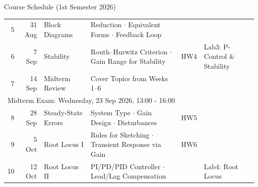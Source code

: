 \documentclass[12pt, aspectratio=169]{beamer}
\begin{document}
\begin{frame}{Course Schedule (1st Semester 2026)}
\begin{tabular}{r|r|l|l|c|l}
    5 & 31 Aug & Block Diagrams & Reduction $\cdot$ Equivalent Forms $\cdot$ Feedback Loop  & &\\
    6 & 7 Sep & Stability & Routh--Hurwitz Criterion $\cdot$ Gain Range for Stability & HW4 & Lab3: P-Control \& Stability \\
    7 & 14 Sep & Midterm Review & Cover Topics from Weeks 1--6 & & \\
    \midrule
    \multicolumn{6}{l}{Midterm Exam: Wednesday, 23 Sep 2026, 13:00 - 16:00} \\
    \midrule
    8 & 28 Sep & Steady-State Errors & System Type $\cdot$ Gain Design $\cdot$ Disturbances & HW5 & \\
    9 & 5 Oct & Root Locus I & Rules for Sketching $\cdot$ Transient Response via Gain & HW6 & \\
    10 & 12 Oct & Root Locus II & PI/PD/PID Controller $\cdot$ Lead/Lag Compensation& & Lab4: Root Locus \\

\end{tabular}
\end{frame}
\end{document}
